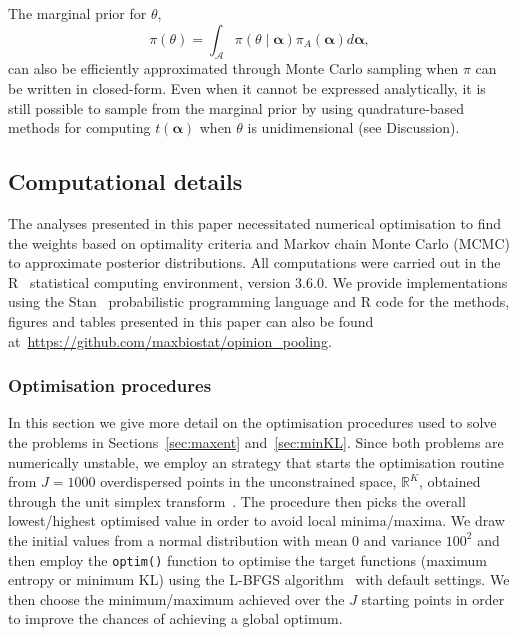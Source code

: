 \documentclass[a4paper, notitlepage, 10pt]{article}
\begin{document}
The marginal prior for $\theta$,
\begin{equation}
\label{eq:marginalbeta}
\pi(\theta) = \int_{\mathcal{A}} \pi(\theta \mid \boldsymbol\alpha) \pi_A(\boldsymbol\alpha)d\boldsymbol\alpha,
\end{equation}
can also be efficiently approximated through Monte Carlo sampling when $\pi$ can be written in closed-form.
Even when it cannot be expressed analytically, it is still possible to sample from the marginal prior by using quadrature-based methods for computing $t(\boldsymbol\alpha)$ when $\theta$ is unidimensional (see Discussion).

\subsection{Computational details}
\label{sec:computation}

The analyses presented in this paper necessitated numerical optimisation to find the weights based on optimality criteria and Markov chain Monte Carlo (MCMC) to approximate posterior distributions.
All computations were carried out in the R~\citep{R2019} statistical computing environment, version 3.6.0. 
We provide implementations using the Stan~\citep{stan2014} probabilistic programming language and R code for the methods, figures and tables presented in this paper can also be found at~\url{https://github.com/maxbiostat/opinion_pooling}.

\subsubsection{Optimisation procedures}
\label{sec:computation_opt}

In this section we give more detail on the optimisation procedures used to solve the problems in Sections~\ref{sec:maxent} and~\ref{sec:minKL}.
Since both problems are numerically unstable, we employ an strategy that starts the optimisation routine from $J = 1000$ overdispersed points in the unconstrained space, $\mathbb{R}^K$, obtained through the unit simplex transform~\citep{Betancourt2012}.
The procedure then picks the overall lowest/highest optimised value in order to avoid local minima/maxima.
We draw the initial values from a normal distribution with mean $0$ and variance $100^2$ and then employ the \verb|optim()| function to optimise the target functions (maximum entropy or minimum KL) using the L-BFGS algorithm~\citep{byrd1995} with default settings.
We then choose the minimum/maximum achieved over the $J$ starting points in order to improve the chances of achieving a global optimum.
\end{document}

